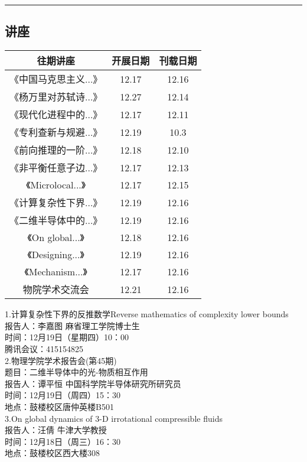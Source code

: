 \documentclass[letterpaper, 12pt]{article}
\begin{document}
\hrule
\pagebreak
\begin{multicols}{2}

\section{讲座}
\begin{tabular}{|c|c|c|}
    \hline
    往期讲座 & 开展日期 & 刊载日期\\
    \hline\hline
《中国马克思主义...》& 12.17 & 12.16\\
《杨万里对苏轼诗...》 & 12.27 & 12.14\\
《现代化进程中的...》 & 12.17 & 12.11\\
《专利查新与规避...》 & 12.19 & 10.3\\
《前向推理的一阶...》 & 12.18 & 12.10\\
《非平衡任意子边...》 & 12.17 & 12.13\\
《Microlocal...》 & 12.17 & 12.15\\
《计算复杂性下界...》 & 12.19 & 12.16\\
《二维半导体中的...》 & 12.19 & 12.16\\
《On global...》 & 12.18 & 12.16\\
《Designing...》 & 12.19 & 12.16\\
《Mechanism...》 & 12.17 & 12.16\\
物院学术交流会 & 12.21 & 12.16\\
    \hline
\end{tabular}

1.计算复杂性下界的反推数学Reverse mathematics of complexity lower bounds\\
报告人：李嘉图 麻省理工学院博士生\\
时间：12月19日（星期四）10：00\\
腾讯会议：415154825\\

2.物理学院学术报告会(第45期)\\
题目：二维半导体中的光-物质相互作用\\
报告人：谭平恒 中国科学院半导体研究所研究员\\
时间：12月19日（周四）15：30\\
地点：鼓楼校区唐仲英楼B501\\

3.On global dynamics of 3-D irrotational compressible fluids\\
报告人：汪倩 牛津大学教授\\
时间：12月18日（周三）16：30\\
地点：鼓楼校区西大楼308\\


\end{multicols}
\end{document}
